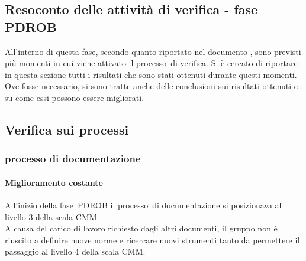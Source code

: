 \documentclass[../PianoDiQualifica.tex]{subfiles}
\begin{document}
\begin{appendices}
\section{Resoconto delle attività di verifica - fase PDROB}
All'interno di questa fase\g, secondo quanto riportato nel documento \pianodiprogetto, sono previsti più momenti in cui viene attivato il processo\g\ di verifica. Si è cercato di riportare in questa sezione tutti i risultati che sono stati ottenuti durante questi momenti. Ove fosse necessario, si sono tratte anche delle conclusioni sui risultati ottenuti e su come essi possono essere migliorati.
	
	\subsection{Verifica sui processi}
		\subsubsection{processo di documentazione}
			\paragraph{Miglioramento costante}
			All'inizio della fase\g\ PDROB il processo\g\ di documentazione si posizionava al livello 3 della scala CMM\g.\\
			A causa del carico di lavoro richiesto dagli altri documenti, il gruppo non è riuscito a definire nuove norme e ricercare nuovi strumenti tanto da permettere il passaggio al livello 4 della scala CMM\g.
			

\end{appendices}
\end{document}
